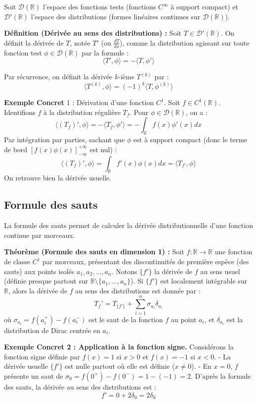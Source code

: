 \documentclass[11pt,a4paper]{article}
\begin{document}
Soit $\mathcal{D}(\mathbb{R})$ l'espace des fonctions tests (fonctions $C^\infty$ à support compact) et $\mathcal{D}'(\mathbb{R})$ l'espace des distributions (formes linéaires continues sur $\mathcal{D}(\mathbb{R})$).

\textbf{Définition (Dérivée au sens des distributions) :}
Soit $T \in \mathcal{D}'(\mathbb{R})$. On définit la dérivée de $T$, notée $T'$ (ou $\frac{dT}{dx}$), comme la distribution agissant sur toute fonction test $\phi \in \mathcal{D}(\mathbb{R})$ par la formule :
$$ \langle T', \phi \rangle = - \langle T, \phi' \rangle $$

Par récurrence, on définit la dérivée $k$-ième $T^{(k)}$ par :
$$ \langle T^{(k)}, \phi \rangle = (-1)^k \langle T, \phi^{(k)} \rangle $$

\textbf{Exemple Concret} 1 : Dérivation d'une fonction $C^1$.
Soit $f \in C^1(\mathbb{R})$. Identifions $f$ à la distribution régulière $T_f$. Pour $\phi \in \mathcal{D}(\mathbb{R})$, on a :
$$ \langle (T_f)', \phi \rangle = - \langle T_f, \phi' \rangle = - \int_{\mathbb{R}} f(x) \phi'(x) dx $$
Par intégration par parties, sachant que $\phi$ est à support compact (donc le terme de bord $[f(x)\phi(x)]_{-\infty}^{+\infty}$ est nul) :
$$ \langle (T_f)', \phi \rangle = \int_{\mathbb{R}} f'(x) \phi(x) dx = \langle T_{f'}, \phi \rangle $$
On retrouve bien la dérivée usuelle.

\subsection{Formule des sauts}

La formule des sauts permet de calculer la dérivée distributionnelle d'une fonction continue par morceaux.

\textbf{Théorème (Formule des sauts en dimension 1) :}
Soit $f : \mathbb{R} \to \mathbb{R}$ une fonction de classe $C^1$ par morceaux, présentant des discontinuités de première espèce (des sauts) aux points isolés $a_1, a_2, \dots, a_n$.
Notons $\{f'\}$ la dérivée de $f$ au sens usuel (définie presque partout sur $\mathbb{R} \setminus \{a_1, \dots, a_n\}$).
Si $\{f'\}$ est localement intégrable sur $\mathbb{R}$, alors la dérivée de $f$ au sens des distributions est donnée par :
$$ T_f' = T_{\{f'\}} + \sum_{i=1}^n \sigma_{a_i} \delta_{a_i} $$
où $\sigma_{a_i} = f(a_i^+) - f(a_i^-)$ est le saut de la fonction $f$ au point $a_i$, et $\delta_{a_i}$ est la distribution de Dirac centrée en $a_i$.

\textbf{Exemple Concret 2 : Application à la fonction signe.}
Considérons la fonction signe définie par $f(x) = 1$ si $x > 0$ et $f(x) = -1$ si $x < 0$.
- La dérivée usuelle $\{f'\}$ est nulle partout où elle est définie ($x \neq 0$).
- En $x = 0$, $f$ présente un saut de $\sigma_0 = f(0^+) - f(0^-) = 1 - (-1) = 2$.
D'après la formule des sauts, la dérivée au sens des distributions est :
$$ f' = 0 + 2\delta_0 = 2\delta_0 $$
\end{document}

